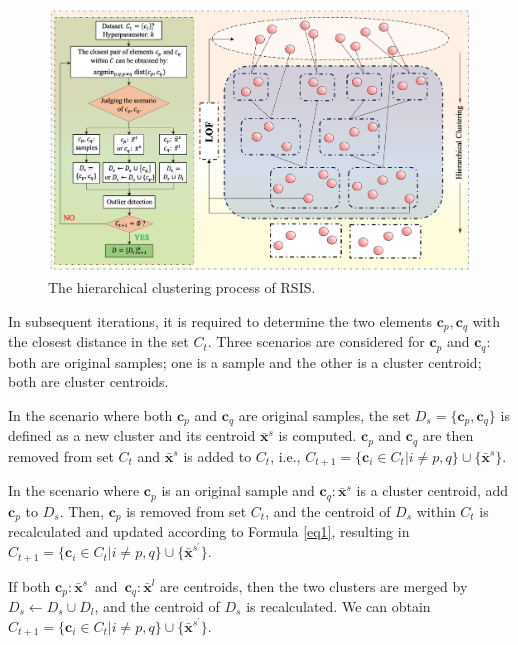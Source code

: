 \documentclass[final,3p,times]{elsarticle}
\begin{document}
\begin{figure}[t!]
  \centering
  \includegraphics[scale=0.56]{Fig2.png}
  \caption{The hierarchical clustering process of RSIS.}
  \label{Fig2}
\end{figure}

In subsequent iterations, it is required to determine the two 
elements $\boldsymbol{c}_p,\boldsymbol{c}_q$ with the closest 
distance in the set $C_t$. Three scenarios are considered 
for $\boldsymbol{c}_p$ and $\boldsymbol{c}_q$: both are 
original samples; one is a sample and the other is a cluster 
centroid; both are cluster centroids.

In the scenario where both $\boldsymbol{c}_p$ and $
\boldsymbol{c}_q$ are original samples, the set $D_s=\{
  \boldsymbol{c}_p,\boldsymbol{c}_q\}$ is defined as a new cluster 
  and its centroid $\bar{\boldsymbol{x}}^s$ is computed. 
  $\boldsymbol{c}_p$ and $\boldsymbol{c}_q$ are then removed 
  from set $C_t$ and $\bar{\boldsymbol{x}}^s$ is added to $C_t$, i.e.,
   $C_{t+1}=\{\boldsymbol{c}_i \in C_{t} | i \neq p, q\} \cup 
   \{\bar{\boldsymbol{x}}^s\}$.

In the scenario where $\boldsymbol{c}_p$ is an original sample and 
$\boldsymbol{c}_q:{\bar{\boldsymbol{x}}^s}$ is a cluster centroid, 
add $\boldsymbol{c}_p$ to $D_s$. Then, $\boldsymbol{c}_p$ is removed 
from set $C_t$, and the centroid of $D_s$ within $C_t$ is 
recalculated and updated according to Formula \eqref{eq1}, resulting in 
$C_{t+1}=\{\boldsymbol{c}_i \in C_{t} | i \neq p, q\}\cup \{ 
  \bar{\boldsymbol{x}}^{s^\prime} \}$.

If both $\boldsymbol{c}_p:{\bar{\boldsymbol{x}}^s}$ and $
\boldsymbol{c}_q:{\bar{\boldsymbol{x}}^l}$ are centroids, then 
the two clusters are merged by $D_s \leftarrow D_s  
{\cup}  D_l$, and the centroid of $D_s$ is recalculated. We can 
obtain $C_{t+1}=\{\boldsymbol{c}_i \in C_{t} | i \neq p, q\} \cup \{
  \bar{\boldsymbol{x}}^{s^\prime}\}$.
\end{document}
